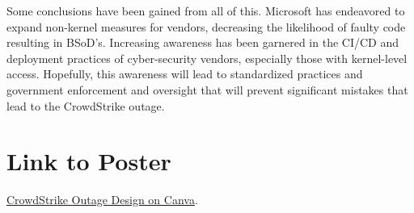 Some conclusions have been gained from all of this. Microsoft has endeavored to expand non-kernel measures for vendors, decreasing the likelihood of faulty code resulting in BSoD's. Increasing awareness has been garnered in the CI/CD and deployment practices of cyber-security vendors, especially those with kernel-level access. Hopefully, this awareness will lead to standardized practices and government enforcement and oversight that will prevent significant mistakes that lead to the CrowdStrike outage.


\section{Link to Poster}
\href{https://www.canva.com/design/DAGYFT-oIGI/HfmDUd-mdGLTYA6mVfXg6A/edit?utm_content=DAGYFT-oIGI&utm_campaign=designshare&utm_medium=link2&utm_source=sharebutton}{CrowdStrike Outage Design on Canva}.

